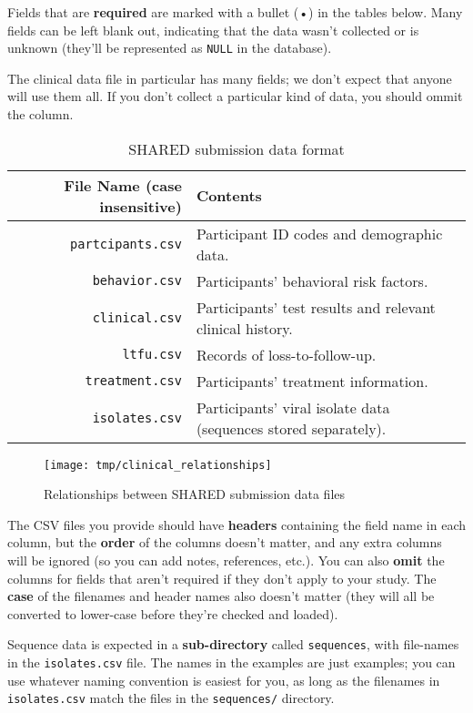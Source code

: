 \documentclass{article}
\begin{document}
Fields that are \textbf{required} are marked with a bullet (•) in the
tables below.  Many fields can be left blank out, indicating that the
data wasn't collected or is unknown (they'll be represented as
\texttt{NULL} in the database).

The clinical data file in particular has many fields; we don't expect
that anyone will use them all. If you don't collect a particular kind
of data, you should ommit the column.


\begin{table}[h!]
  \caption{SHARED submission data format}
  \label{tbl:expectedfiles}
  \begin{tabular}{rp{8cm}}
    File Name (case insensitive) & Contents \\ \hline
    \verb|partcipants.csv| & Participant ID codes and demographic data. \\
    \verb|behavior.csv| &  Participants' behavioral risk factors. \\
    \verb|clinical.csv| & Participants' test results and relevant clinical history. \\
    \verb|ltfu.csv| & Records of loss-to-follow-up. \\
    \verb|treatment.csv| &  Participants' treatment information. \\
    \verb|isolates.csv| & Participants' viral isolate data (sequences stored separately). \\
  \end{tabular}
\end{table}

\begin{figure}
  \caption{Relationships between SHARED submission data files}
  \label{fig:relationships}
  \texttt{[image: tmp/clinical\_relationships]}
\end{figure}

The CSV files you provide should have \textbf{headers} containing the
field name in each column, but the \textbf{order} of the columns
doesn't matter, and any extra columns will be ignored (so you can add
notes, references, etc.). You can also \textbf{omit} the columns for
fields that aren't required if they don't apply to your study. The
\textbf{case} of the filenames and header names also doesn't matter
(they will all be converted to lower-case before they're checked and
loaded).

Sequence data is expected in a \textbf{sub-directory} called
\texttt{sequences}, with file-names in the \texttt{isolates.csv}
file. The names in the examples are just examples; you can use
whatever naming convention is easiest for you, as long as the
filenames in \texttt{isolates.csv} match the files in the
\texttt{sequences/} directory.
\end{document}

